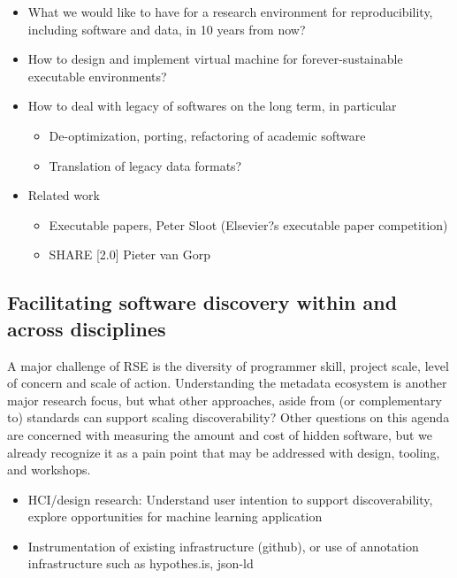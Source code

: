 \documentclass[a4paper,UKenglish]{dagman}
\begin{document}
\begin{itemize}
\item What we would like to have for a research environment for reproducibility, including  software and data, in 10 years from now? 
\item How to design and implement virtual machine for forever-sustainable executable environments? 
\item How to deal with legacy of softwares on the long term, in particular

\begin{itemize}
\item De-optimization, porting, refactoring of academic software
\item Translation of legacy data formats?
\end{itemize}

\item Related work

\begin{itemize}
\item Executable papers, Peter Sloot (Elsevier?s executable paper competition)
\item SHARE [2.0] Pieter van Gorp
\end{itemize}

\end{itemize}


\subsection{Facilitating software discovery within and across disciplines}

A major challenge of RSE is the diversity of programmer skill, project scale, level of concern and scale of action. Understanding the metadata ecosystem is another major research focus, but what other approaches, aside from (or complementary to) standards can support scaling discoverability? Other questions on this agenda are concerned with measuring the amount and cost of hidden software, but we already recognize it as a pain point that may be addressed with design, tooling, and workshops.


\begin{itemize}
\item HCI/design research: Understand user intention to support discoverability, explore opportunities for machine learning application
\item Instrumentation of existing infrastructure (github), or use of annotation infrastructure such as hypothes.is, json-ld
\end{itemize}
\end{document}
